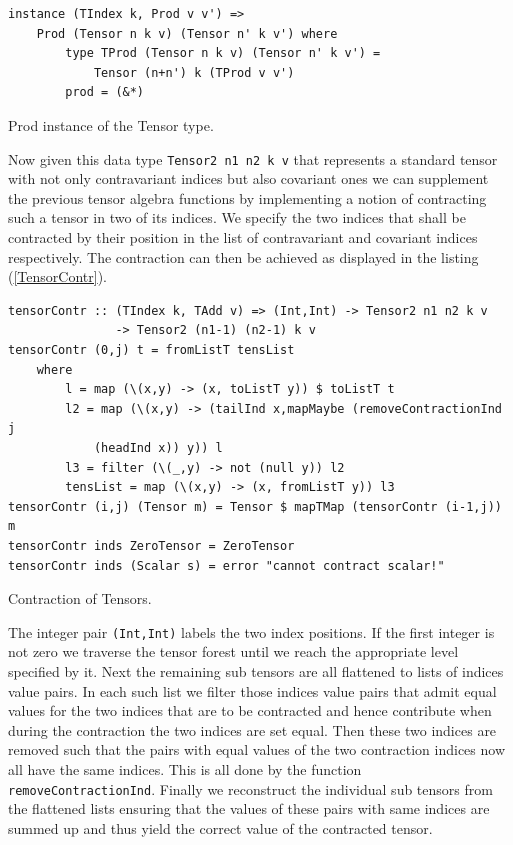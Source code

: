 \documentclass[a4paper,12pt, DIV=14, BCOR=5mm, twoside, headsepline, numbers=noenddot]{scrbook}
\begin{document}
\begin{listing}[hbt!]
\begin{verbatim}
instance (TIndex k, Prod v v') => 
    Prod (Tensor n k v) (Tensor n' k v') where
        type TProd (Tensor n k v) (Tensor n' k v') = 
            Tensor (n+n') k (TProd v v')
        prod = (&*)
\end{verbatim} 
\caption{Prod instance of the Tensor type.}\label{TensProd}
\end{listing}

Now given this data type \texttt{Tensor2 n1 n2 k v} that represents a standard tensor with not only contravariant indices but also covariant ones we can supplement the previous tensor algebra functions by implementing a notion of contracting such a tensor in two of its indices.
We specify the two indices that shall be contracted by their position in the list of contravariant and covariant indices respectively. The contraction can then be achieved as displayed in the listing (\ref{TensorContr}).

\begin{listing}[hbt!] 
\begin{verbatim}
tensorContr :: (TIndex k, TAdd v) => (Int,Int) -> Tensor2 n1 n2 k v
               -> Tensor2 (n1-1) (n2-1) k v
tensorContr (0,j) t = fromListT tensList
    where
        l = map (\(x,y) -> (x, toListT y)) $ toListT t
        l2 = map (\(x,y) -> (tailInd x,mapMaybe (removeContractionInd j
            (headInd x)) y)) l
        l3 = filter (\(_,y) -> not (null y)) l2
        tensList = map (\(x,y) -> (x, fromListT y)) l3
tensorContr (i,j) (Tensor m) = Tensor $ mapTMap (tensorContr (i-1,j)) m
tensorContr inds ZeroTensor = ZeroTensor
tensorContr inds (Scalar s) = error "cannot contract scalar!"
\end{verbatim} 
\caption{Contraction of Tensors.}\label{TensorContr}
\end{listing}

The integer pair \texttt{(Int,Int)} labels the two index positions. If the first integer is not zero we traverse the tensor forest until we reach the appropriate level specified by it. Next the remaining sub tensors are all flattened to lists of indices value pairs. In each such list we filter those indices value pairs that admit equal values for the two indices that are to be contracted and hence contribute when during the contraction the two indices are set equal. Then these two indices are removed such that the pairs with equal values of the two contraction indices now all have the same indices. This is all done by the function \texttt{removeContractionInd}. Finally we reconstruct the individual sub tensors from the flattened lists ensuring that the values of these pairs with same indices are summed up and thus yield the correct value of the contracted tensor. \\
\end{document}
